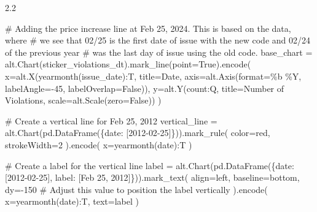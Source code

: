 \documentclass[
  letterpaper,
  DIV=11,
  numbers=noendperiod]{scrartcl}
\newenvironment{Shaded}{\begin{snugshade}}{\end{snugshade}}
\newcommand{\BuiltInTok}[1]{\textcolor[rgb]{0.00,0.23,0.31}{#1}}
\newcommand{\CommentTok}[1]{\textcolor[rgb]{0.37,0.37,0.37}{#1}}
\newcommand{\DecValTok}[1]{\textcolor[rgb]{0.68,0.00,0.00}{#1}}
\newcommand{\NormalTok}[1]{\textcolor[rgb]{0.00,0.23,0.31}{#1}}
\newcommand{\OperatorTok}[1]{\textcolor[rgb]{0.37,0.37,0.37}{#1}}
\newcommand{\StringTok}[1]{\textcolor[rgb]{0.13,0.47,0.30}{#1}}
\newcommand{\VariableTok}[1]{\textcolor[rgb]{0.07,0.07,0.07}{#1}}
\begin{document}
2.2

\begin{Shaded}
\begin{Highlighting}[]
\CommentTok{\# Adding the price increase line at Feb 25, 2024. This is based on the data, where}
\CommentTok{\# we see that 02/25 is the first date of issue with the new code and 02/24 of the previous year}
\CommentTok{\# was the last day of issue using the old code.}
\NormalTok{base\_chart }\OperatorTok{=}\NormalTok{ alt.Chart(sticker\_violations\_dt).mark\_line(point}\OperatorTok{=}\VariableTok{True}\NormalTok{).encode(}
\NormalTok{    x}\OperatorTok{=}\NormalTok{alt.X(}\StringTok{\textquotesingle{}yearmonth(issue\_date):T\textquotesingle{}}\NormalTok{, }
\NormalTok{            title}\OperatorTok{=}\StringTok{\textquotesingle{}Date\textquotesingle{}}\NormalTok{,}
\NormalTok{            axis}\OperatorTok{=}\NormalTok{alt.Axis(}\BuiltInTok{format}\OperatorTok{=}\StringTok{\textquotesingle{}\%b \%Y\textquotesingle{}}\NormalTok{, labelAngle}\OperatorTok{={-}}\DecValTok{45}\NormalTok{, labelOverlap}\OperatorTok{=}\VariableTok{False}\NormalTok{)),}
\NormalTok{    y}\OperatorTok{=}\NormalTok{alt.Y(}\StringTok{\textquotesingle{}count:Q\textquotesingle{}}\NormalTok{, }
\NormalTok{            title}\OperatorTok{=}\StringTok{\textquotesingle{}Number of Violations\textquotesingle{}}\NormalTok{,}
\NormalTok{            scale}\OperatorTok{=}\NormalTok{alt.Scale(zero}\OperatorTok{=}\VariableTok{False}\NormalTok{))}
\NormalTok{)}

\CommentTok{\# Create a vertical line for Feb 25, 2012}
\NormalTok{vertical\_line }\OperatorTok{=}\NormalTok{ alt.Chart(pd.DataFrame(\{}\StringTok{\textquotesingle{}date\textquotesingle{}}\NormalTok{: [}\StringTok{\textquotesingle{}2012{-}02{-}25\textquotesingle{}}\NormalTok{]\})).mark\_rule(}
\NormalTok{    color}\OperatorTok{=}\StringTok{\textquotesingle{}red\textquotesingle{}}\NormalTok{,}
\NormalTok{    strokeWidth}\OperatorTok{=}\DecValTok{2}
\NormalTok{).encode(}
\NormalTok{    x}\OperatorTok{=}\StringTok{\textquotesingle{}yearmonth(date):T\textquotesingle{}}
\NormalTok{)}

\CommentTok{\# Create a label for the vertical line}
\NormalTok{label }\OperatorTok{=}\NormalTok{ alt.Chart(pd.DataFrame(\{}\StringTok{\textquotesingle{}date\textquotesingle{}}\NormalTok{: [}\StringTok{\textquotesingle{}2012{-}02{-}25\textquotesingle{}}\NormalTok{], }\StringTok{\textquotesingle{}label\textquotesingle{}}\NormalTok{: [}\StringTok{\textquotesingle{}Feb 25, 2012\textquotesingle{}}\NormalTok{]\})).mark\_text(}
\NormalTok{    align}\OperatorTok{=}\StringTok{\textquotesingle{}left\textquotesingle{}}\NormalTok{,}
\NormalTok{    baseline}\OperatorTok{=}\StringTok{\textquotesingle{}bottom\textquotesingle{}}\NormalTok{,}
\NormalTok{    dy}\OperatorTok{={-}}\DecValTok{150}  \CommentTok{\# Adjust this value to position the label vertically}
\NormalTok{).encode(}
\NormalTok{    x}\OperatorTok{=}\StringTok{\textquotesingle{}yearmonth(date):T\textquotesingle{}}\NormalTok{,}
\NormalTok{    text}\OperatorTok{=}\StringTok{\textquotesingle{}label\textquotesingle{}}
\NormalTok{)}


\end{Highlighting}
\end{Shaded}
\end{document}
